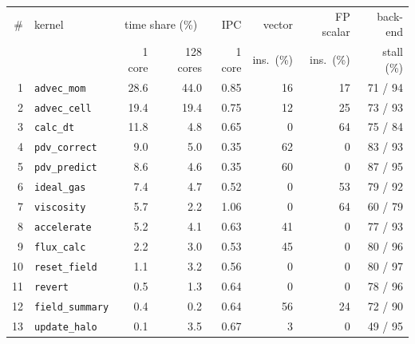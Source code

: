 \begin{tabular}{rlrrrrrr}
\toprule
\# & kernel & \multicolumn{2}{c}{time share (\%)} & IPC & vector & FP scalar & back-end \\
 & & 1 core & 128 cores & 1 core & ins.\ (\%) & ins.\ (\%) & stall (\%) \\
\midrule
1 & \texttt{advec\_mom} & 28.6 & 44.0 & 0.85 & 16 & 17 & 71 / 94 \\
2 & \texttt{advec\_cell} & 19.4 & 19.4 & 0.75 & 12 & 25 & 73 / 93 \\
3 & \texttt{calc\_dt} & 11.8 & 4.8 & 0.65 & 0 & 64 & 75 / 84 \\
4 & \texttt{pdv\_correct} & 9.0 & 5.0 & 0.35 & 62 & 0 & 83 / 93 \\
5 & \texttt{pdv\_predict} & 8.6 & 4.6 & 0.35 & 60 & 0 & 87 / 95 \\
6 & \texttt{ideal\_gas} & 7.4 & 4.7 & 0.52 & 0 & 53 & 79 / 92 \\
7 & \texttt{viscosity} & 5.7 & 2.2 & 1.06 & 0 & 64 & 60 / 79 \\
8 & \texttt{accelerate} & 5.2 & 4.1 & 0.63 & 41 & 0 & 77 / 93 \\
9 & \texttt{flux\_calc} & 2.2 & 3.0 & 0.53 & 45 & 0 & 80 / 96 \\
10 & \texttt{reset\_field} & 1.1 & 3.2 & 0.56 & 0 & 0 & 80 / 97 \\
11 & \texttt{revert} & 0.5 & 1.3 & 0.64 & 0 & 0 & 78 / 96 \\
12 & \texttt{field\_summary} & 0.4 & 0.2 & 0.64 & 56 & 24 & 72 / 90 \\
13 & \texttt{update\_halo} & 0.1 & 3.5 & 0.67 & 3 & 0 & 49 / 95 \\
\bottomrule
\end{tabular}
